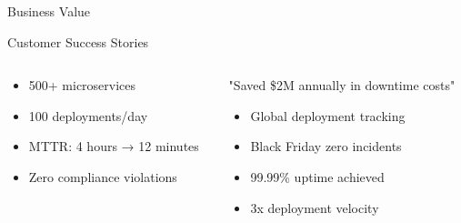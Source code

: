 \documentclass[presentation,aspectratio=169]{beamer}
\begin{document}
\begin{frame}[label={sec:orgd8892de}]{Business Value}
\begin{block}{Customer Success Stories}
\begin{columns}
\begin{column}{0.5\columnwidth}
\begin{itemize}
\item 500+ microservices
\item 100 deployments/day
\item MTTR: 4 hours → 12 minutes
\item Zero compliance violations
\end{itemize}
\end{column}
\begin{column}{0.5\columnwidth}
"Saved \$2M annually in downtime costs"

\begin{itemize}
\item Global deployment tracking
\item Black Friday zero incidents
\item 99.99\% uptime achieved
\item 3x deployment velocity
\end{itemize}
\end{column}
\end{columns}
\end{block}
\end{frame}
\end{document}
